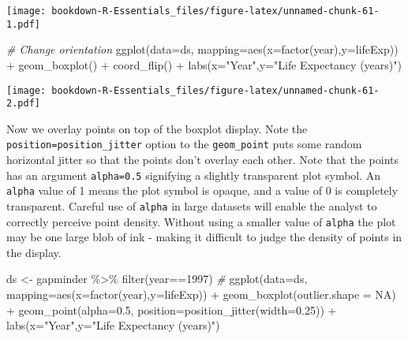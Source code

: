 \documentclass[
]{book}
\newenvironment{Shaded}{\begin{snugshade}}{\end{snugshade}}
\newcommand{\AttributeTok}[1]{\textcolor[rgb]{0.77,0.63,0.00}{#1}}
\newcommand{\CommentTok}[1]{\textcolor[rgb]{0.56,0.35,0.01}{\textit{#1}}}
\newcommand{\ConstantTok}[1]{\textcolor[rgb]{0.00,0.00,0.00}{#1}}
\newcommand{\DecValTok}[1]{\textcolor[rgb]{0.00,0.00,0.81}{#1}}
\newcommand{\FloatTok}[1]{\textcolor[rgb]{0.00,0.00,0.81}{#1}}
\newcommand{\FunctionTok}[1]{\textcolor[rgb]{0.00,0.00,0.00}{#1}}
\newcommand{\NormalTok}[1]{#1}
\newcommand{\OtherTok}[1]{\textcolor[rgb]{0.56,0.35,0.01}{#1}}
\newcommand{\SpecialCharTok}[1]{\textcolor[rgb]{0.00,0.00,0.00}{#1}}
\newcommand{\StringTok}[1]{\textcolor[rgb]{0.31,0.60,0.02}{#1}}
\begin{document}
\texttt{[image: bookdown-R-Essentials\_files/figure-latex/unnamed-chunk-61-1.pdf]}

\begin{Shaded}
\begin{Highlighting}[]
\CommentTok{\# Change orientation}
\FunctionTok{ggplot}\NormalTok{(}\AttributeTok{data=}\NormalTok{ds, }\AttributeTok{mapping=}\FunctionTok{aes}\NormalTok{(}\AttributeTok{x=}\FunctionTok{factor}\NormalTok{(year),}\AttributeTok{y=}\NormalTok{lifeExp)) }\SpecialCharTok{+}
 \FunctionTok{geom\_boxplot}\NormalTok{() }\SpecialCharTok{+} 
  \FunctionTok{coord\_flip}\NormalTok{() }\SpecialCharTok{+} 
  \FunctionTok{labs}\NormalTok{(}\AttributeTok{x=}\StringTok{"Year"}\NormalTok{,}\AttributeTok{y=}\StringTok{"Life Expectancy (years)"}\NormalTok{)}
\end{Highlighting}
\end{Shaded}

\texttt{[image: bookdown-R-Essentials\_files/figure-latex/unnamed-chunk-61-2.pdf]}

Now we overlay points on top of the boxplot display. Note the \texttt{position=position\_jitter} option to the \texttt{geom\_point} puts some random horizontal jitter so that the points don't overlay each other. Note that the points has an argument \texttt{alpha=0.5} signifying a slightly transparent plot symbol. An \texttt{alpha} value of 1 means the plot symbol is opaque, and a value of 0 is completely transparent. Careful use of \texttt{alpha} in large datasets will enable the analyst to correctly perceive point density. Without using a smaller value of \texttt{alpha} the plot may be one large blob of ink - making it difficult to judge the density of points in the display.

\begin{Shaded}
\begin{Highlighting}[]
\NormalTok{ds }\OtherTok{\textless{}{-}}\NormalTok{ gapminder }\SpecialCharTok{\%\textgreater{}\%} \FunctionTok{filter}\NormalTok{(year}\SpecialCharTok{==}\DecValTok{1997}\NormalTok{) }
\CommentTok{\#}
\FunctionTok{ggplot}\NormalTok{(}\AttributeTok{data=}\NormalTok{ds, }\AttributeTok{mapping=}\FunctionTok{aes}\NormalTok{(}\AttributeTok{x=}\FunctionTok{factor}\NormalTok{(year),}\AttributeTok{y=}\NormalTok{lifeExp)) }\SpecialCharTok{+}
 \FunctionTok{geom\_boxplot}\NormalTok{(}\AttributeTok{outlier.shape =} \ConstantTok{NA}\NormalTok{) }\SpecialCharTok{+} 
 \FunctionTok{geom\_point}\NormalTok{(}\AttributeTok{alpha=}\FloatTok{0.5}\NormalTok{, }\AttributeTok{position=}\FunctionTok{position\_jitter}\NormalTok{(}\AttributeTok{width=}\FloatTok{0.25}\NormalTok{)) }\SpecialCharTok{+}
  \FunctionTok{labs}\NormalTok{(}\AttributeTok{x=}\StringTok{"Year"}\NormalTok{,}\AttributeTok{y=}\StringTok{"Life Expectancy (years)"}\NormalTok{)}
\end{Highlighting}
\end{Shaded}
\end{document}
